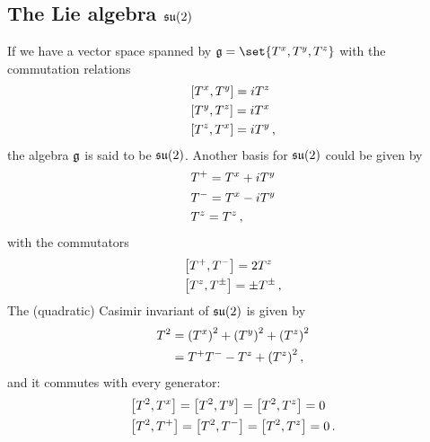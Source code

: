     \subsection{The Lie algebra $\operatorname{\mathfrak{su}}(2)$}
        If we have a vector space spanned by $\glie = \set{T^x, T^y, T^z}$ with the commutation relations
        \begin{align}
            & \comm{T^x}{T^y} = i T^z \\
            & \comm{T^y}{T^z} = i T^x \\
            & \comm{T^z}{T^x} = i T^y \thinspace ,
        \end{align}
        the algebra $\operatorname{\mathfrak{g}}$ is said to be $\operatorname{\mathfrak{su}}(2)$. Another basis for $\operatorname{\mathfrak{su}}(2)$ could be given by
        \begin{align}
            & T^+ = T^x + i T^y \\
            & T^- = T^x - i T^y \\
            & T^z = T^z \thinspace ,
        \end{align}
        with the commutators
        \begin{align}
            & \comm{T^+}{T^-} = 2 T^z \\
            & \comm{T^z}{T^\pm} = \pm T^\pm \thinspace ,
        \end{align}
        The (quadratic) Casimir invariant of $\operatorname{\mathfrak{su}}(2)$ is given by
        \begin{align}
            T^2 &= \qty(T^x)^2 + \qty(T^y)^2 + \qty(T^z)^2 \\
            &= T^+ T^- - T^z + \qty(T^z)^2 \thinspace ,
        \end{align}
        and it commutes with every generator:
        \begin{align}
            & \comm{T^2}{T^x} = \comm{T^2}{T^y} = \comm{T^2}{T^z} = 0 \\
            & \comm{T^2}{T^+} = \comm{T^2}{T^-} = \comm{T^2}{T^z} = 0 \thinspace .
        \end{align}


